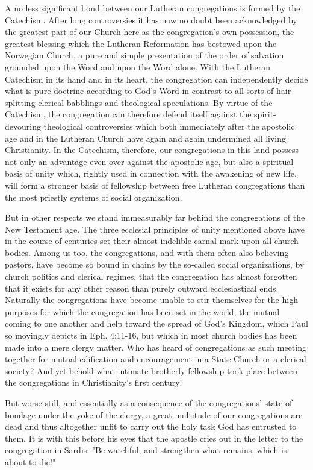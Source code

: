 A no less significant bond between our Lutheran congregations is formed by the Catechism. After long controversies it has now no doubt been acknowledged by the greatest part of our Church here as the congregation's own possession, the greatest blessing which the Lutheran Reformation has bestowed upon the Norwegian Church, a pure and simple presentation of the order of salvation grounded upon the Word and upon the Word alone. With the Lutheran Catechism in its hand and in its heart, the congregation can independently decide what is pure doctrine according to God's Word in contrast to all sorts of hair-splitting clerical babblings and theological speculations. By virtue of the Catechism, the congregation can therefore defend itself against the spirit-devouring theological controversies which both immediately after the apostolic age and in the Lutheran Church have again and again undermined all living Christianity. In the Catechism, therefore, our congregations in this land possess not only an advantage even over against the apostolic age, but also a spiritual basis of unity which, rightly used in connection with the awakening of new life, will form a stronger basis of fellowship between free Lutheran congregations than the most priestly systems of social organization.

But in other respects we stand immeasurably far behind the congregations of the New Testament age. The three ecclesial principles of unity mentioned above have in the course of centuries set their almost indelible carnal mark upon all church bodies. Among us too, the congregations, and with them often also believing pastors, have become so bound in chains by the so-called social organizations, by church politics and clerical regimes, that the congregation has almost forgotten that it exists for any other reason than purely outward ecclesiastical ends. Naturally the congregations have become unable to stir themselves for the high purposes for which the congregation has been set in the world, the mutual coming to one another and help toward the spread of God's Kingdom, which Paul so movingly depicts in Eph. 4:11-16, but which in most church bodies has been made into a mere clergy matter. Who has heard of congregations as such meeting together for mutual edification and encouragement in a State Church or a clerical society? And yet behold what intimate brotherly fellowship took place between the congregations in Christianity's first century!

But worse still, and essentially as a consequence of the congregations' state of bondage under the yoke of the clergy, a great multitude of our congregations are dead and thus altogether unfit to carry out the holy task God has entrusted to them. It is with this before his eyes that the apostle cries out in the letter to the congregation in Sardis: "Be watchful, and strengthen what remains, which is about to die!"

